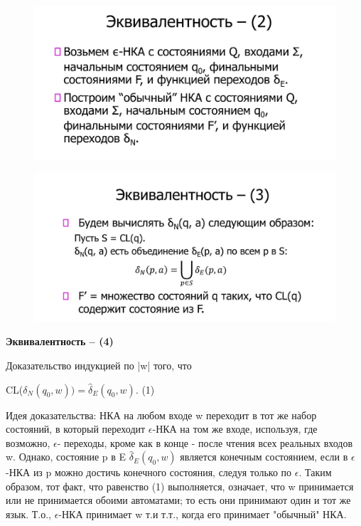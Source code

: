 \documentclass{article}
\begin{document}
\begin{figure}[H]
    \centering
    \includegraphics[width=1\linewidth]{Снимок экрана 2025-03-20 083112.png}
\end{figure}

\begin{figure}[H]
    \centering
    \includegraphics[width=1\linewidth]{Снимок экрана 2025-03-20 083123.png}
\end{figure}


\textbf{Эквивалентность – (4)}

Доказательство индукцией по |w| того, что

CL($\delta_N(q_0,w)) = \widehat{\delta}_E(q_0,w)$. (1)

Идея доказательства: НКА на любом входе w переходит в тот же набор
состояний, в который переходит $\epsilon$-НКА на том же входе, используя, где
возможно, $\epsilon$- переходы, кроме как в конце - после чтения всех реальных
входов w. Однако, состояние p в E
$\widehat{\delta}_E(q_0,w)$ является конечным состоянием,
если в $\epsilon$-НКА из p можно достичь конечного состояния, следуя только по $\epsilon$.
Таким образом, тот факт, что равенство (1) выполняется, означает, что w
принимается или не принимается обоими автоматами; то есть они
принимают один и тот же язык.
Т.о., $\epsilon$-НКА принимает w т.и т.т., когда его принимает "обычный"
НКА.
\end{document}

